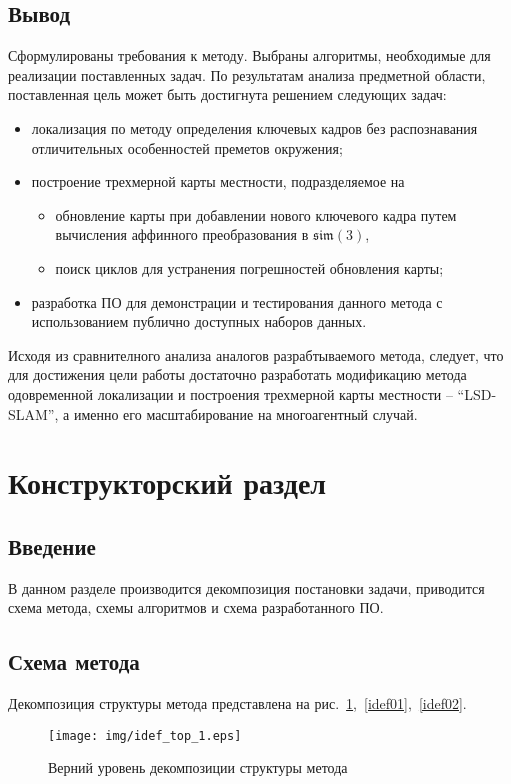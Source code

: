 \subsection{Вывод}
Сформулированы требования к методу. Выбраны алгоритмы, необходимые для реализации поставленных задач. По результатам анализа предметной области, поставленная цель может быть достигнута решением следующих задач:
\begin{itemize}
    \item локализация по методу определения ключевых кадров без распознавания отличительных особенностей преметов окружения;
    \item построение трехмерной карты местности, подразделяемое на
    \begin{itemize}
        \item обновление карты при добавлении нового ключевого кадра путем вычисления аффинного преобразования в $\mathfrak{sim}(3)$,
        \item поиск циклов для устранения погрешностей обновления карты;
    \end{itemize}
    \item разработка ПО для демонстрации и тестирования данного метода с использованием публично доступных наборов данных.
\end{itemize}
Исходя из сравнителного анализа аналогов разрабтываемого метода, следует, что для достижения цели работы достаточно разработать модификацию метода одовременной локализации и построения трехмерной карты местности -- ``LSD-SLAM'', а именно его масштабирование на многоагентный случай.



\section{Конструкторский раздел}
\subsection{Введение}
В данном разделе производится декомпозиция постановки задачи, приводится схема метода, схемы алгоритмов и схема разработанного ПО.

\subsection{Схема метода}
Декомпозиция структуры метода представлена на рис.~\ref{idef00},~\ref{idef01},~\ref{idef02}.
\begin{figure}[H]
\texttt{[image: img/idef\_top\_1.eps]}
\caption{Верний уровень декомпозиции структуры метода}
\label{idef00}
\end{figure}

